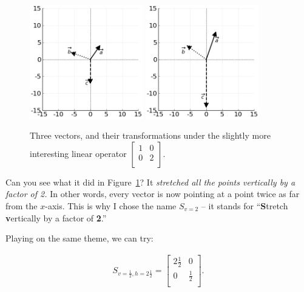 \begin{figure}[ht]
\centering
\includegraphics[width=0.44\textwidth]{preoperators.png}
\includegraphics[width=0.44\textwidth]{vertstretchop.png}
\caption[.]{Three vectors, and their transformations under the slightly more
interesting linear operator 
{\scriptsize $\begin{bmatrix} 1 & 0 \\ 0 & 2 \\ \end{bmatrix}$.}}
\label{fig:vertstretchop}
\end{figure}

Can you see what it did in Figure~\ref{fig:vertstretchop}? It
\textit{stretched all the points vertically by a factor of 2.} In other words,
every vector is now pointing at a point twice as far from the $x$-axis. This is
why I chose the name $S_{v=2}$ -- it stands for ``\textbf{S}tretch
\textbf{v}ertically by a factor of \textbf{2}.''

\pagebreak

Playing on the same theme, we can try:

\vspace{-.15in}
\begin{align*}
S_{v=\frac{1}{2},h=2\frac{1}{2}} =
\begin{bmatrix}
2\frac{1}{2} & 0 \\
0 & \frac{1}{2} \\
\end{bmatrix}.
\end{align*}
\vspace{-.15in}


